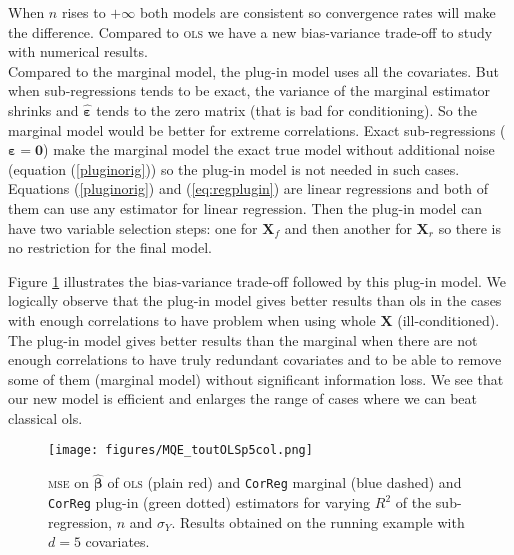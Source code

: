 \documentclass[12pt,a4paper]{report}
\begin{document}
When $n$ rises to $+\infty$ both models are consistent so convergence rates will make the difference.
Compared to \textsc{ols} we have a new bias-variance trade-off to study with numerical results.\\

Compared to the marginal model, the plug-in model uses all the covariates. But when sub-regressions tends to be exact, the variance of the marginal estimator shrinks and $ \hat{\boldsymbol{\varepsilon}}$ tends to the zero matrix (that is bad for conditioning). So the marginal model would be better for extreme correlations. 
Exact sub-regressions ($\boldsymbol{\varepsilon}=\boldsymbol{0}$) make the marginal model the exact true model without additional noise (equation (\ref{pluginorig})) so the plug-in model is not needed in such cases.\\
Equations (\ref{pluginorig}) and (\ref{eq:regplugin}) are linear regressions and both of them can use any estimator for linear regression. Then the plug-in model can have two variable selection steps: one for $\boldsymbol{X}_f$ and then another for $\boldsymbol{X}_r$ so there is no restriction for the final model.
%		

	Figure \ref{MQE2} illustrates the bias-variance trade-off followed by this plug-in model. We logically observe that the plug-in model gives better results than {\sc ols} in the cases with enough correlations to have problem when using whole $\boldsymbol{X}$ (ill-conditioned). The plug-in model gives better results than the marginal when there are not enough correlations to have truly redundant covariates and to be able to remove some of them (marginal model) without significant information loss. We see that our new model is efficient and enlarges the range of cases where we can beat classical {\sc ols}.
\begin{figure}[h!]
\centering
	\texttt{[image: figures/MQE\_toutOLSp5col.png]}
	\caption{\textsc{mse} on $\hat{\boldsymbol{\beta}}$ of \textsc{ols} (plain red) and {\tt CorReg} marginal (blue dashed) and {\tt CorReg} plug-in (green dotted) estimators for varying $R^2$ of the sub-regression, $n$ and $\sigma_Y$. Results obtained on the running example with $d=5$ covariates.}\label{MQE2}
\end{figure}	
			
\end{document}
